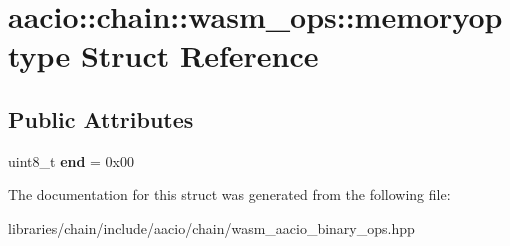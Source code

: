 \hypertarget{structaacio_1_1chain_1_1wasm__ops_1_1memoryoptype}{}\section{aacio\+:\+:chain\+:\+:wasm\+\_\+ops\+:\+:memoryoptype Struct Reference}
\label{structaacio_1_1chain_1_1wasm__ops_1_1memoryoptype}
\subsection*{Public Attributes}
\begin{DoxyCompactItemize}
\item 
\mbox{\label{structaacio_1_1chain_1_1wasm__ops_1_1memoryoptype_a1efae6ec1df6dcd188d5c0016474f6a0}} 
uint8\+\_\+t {\bfseries end} = 0x00
\end{DoxyCompactItemize}


The documentation for this struct was generated from the following file\+:\begin{DoxyCompactItemize}
\item 
libraries/chain/include/aacio/chain/wasm\+\_\+aacio\+\_\+binary\+\_\+ops.\+hpp\end{DoxyCompactItemize}
